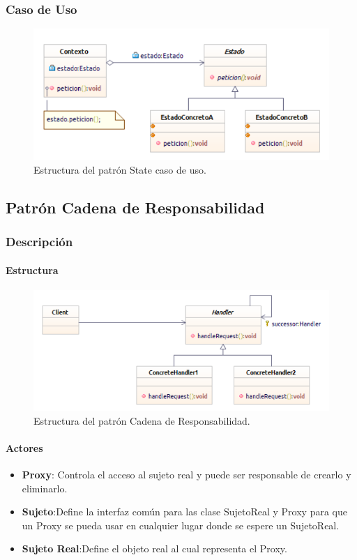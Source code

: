 \subsubsection{Caso de Uso}
\begin{figure}[th!]
	\centering
	\includegraphics[width=.7\linewidth]{imagenes/Patrones/State_caso.pdf}
	\caption{Estructura del patrón State caso de uso.\cite{gof}}	
\end{figure}
\subsection{Patrón Cadena de Responsabilidad}

\subsubsection{Descripción}

\paragraph{Estructura}

\begin{figure}[th!]
	\centering
	\includegraphics[width=.7\linewidth]{imagenes/Patrones/Cadena.pdf}
	\caption{Estructura del patrón Cadena de Responsabilidad.\cite{gof}}	
\end{figure}

\paragraph{Actores}

\begin{itemize}
	\item \textbf{Proxy}: Controla el acceso al sujeto real y puede ser responsable de crearlo y eliminarlo.
	\item \textbf{Sujeto}:Define la interfaz común para las clase SujetoReal y Proxy para que un Proxy se pueda usar en cualquier lugar donde se espere un SujetoReal.
	\item \textbf{Sujeto Real}:Define el objeto real al cual representa el Proxy.
\end{itemize}


